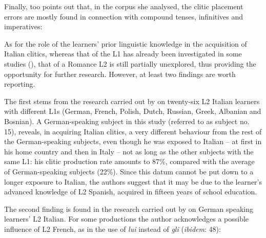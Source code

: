 \documentclass[output=paper,modfonts,nonflat,newtxmath]{langsci/langscibook}
\begin{document}
\z

\z

Finally, \citet[58]{Corino2012} too points out that, in the corpus she analysed, the clitic placement errors are mostly found in connection with compound tenses, infinitives and imperatives:

\z

As for the role of the learners’ prior linguistic knowledge in the acquisition of Italian clitics, whereas that of the L1 has already been investigated in some studies (\citealt{Berretta1986, LeoniniBelletti2004, BennatiMatteini2006, GianniniCancila2006,Giannini2008, Maffei2009}), that of a Romance L2 is still partially unexplored, thus providing the opportunity for further research. However, at least two findings are worth reporting.

The first stems from the research carried out by \citet{LeoniniBelletti2004} on twenty-six L2 Italian learners with different L1s (German, French, Polish, Dutch, Russian, Greek, Albanian and Bosnian). A German-speaking subject in this study (referred to as subject no. 15), reveals, in acquiring Italian clitics, a very different behaviour from the rest of the German-speaking subjects, even though he was exposed to Italian – at first in his home country and then in Italy – not as long as the other subjects with the same L1: his clitic production rate amounts to 87\%, compared with the average of German-speaking subjects (22\%). Since this datum cannot be put down to a longer exposure to Italian, the authors suggest that it may be due to the learner’s advanced knowledge of L2 Spanish, acquired in fifteen years of school education.

The second finding is found in the research carried out by \citet{Corino2012} on German speaking learners’ L2 Italian. For some productions the author acknowledges a possible influence of L2 French, as in the use of \textit{lui} instead of \textit{gli} (\textit{ibidem}: 48):
\end{document}
